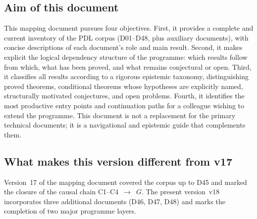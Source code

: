 \documentclass[11pt,a4paper]{article}
\theoremstyle{plain}
\theoremstyle{definition}
\theoremstyle{remark}
\begin{document}
\subsection{Aim of this document}
\label{subsec:aim}
This mapping document pursues four objectives. First, it provides a complete and current inventory of the PDL corpus (D01--D48, plus auxiliary documents), with concise descriptions of each document's role and main result. Second, it makes explicit the logical dependency structure of the programme: which results follow from which, what has been proved, and what remains conjectural or open. Third, it classifies all results according to a rigorous epistemic taxonomy, distinguishing proved theorems, conditional theorems whose hypotheses are explicitly named, structurally motivated conjectures, and open problems. Fourth, it identifies the most productive entry points and continuation paths for a colleague wishing to extend the programme. This document is not a replacement for the primary technical documents; it is a navigational and epistemic guide that complements them.

\subsection{What makes this version different from v17}
\label{subsec:diffv17}
Version~17 of the mapping document covered the corpus up to D45 and marked the closure of the causal chain C1--C4~$\to$~$G$. The present version~v18 incorporates three additional documents (D46, D47, D48) and marks the completion of two major programme layers.
\end{document}
